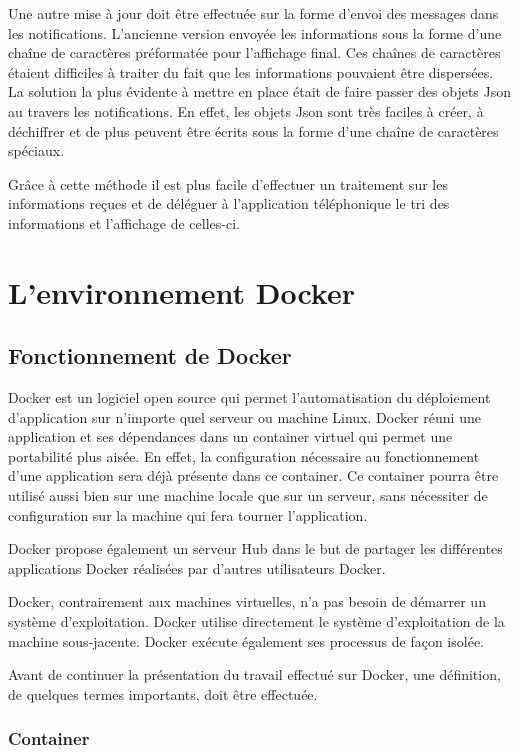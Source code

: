 Une autre mise à jour doit être effectuée sur la forme d'envoi des messages dans les notifications. L'ancienne version envoyée les informations sous la forme d'une chaîne de caractères préformatée pour l'affichage final. Ces chaînes de caractères étaient difficiles à traiter du fait que les informations pouvaient être dispersées. La solution la plus évidente à mettre en place était de faire passer des objets Json au travers les notifications. En effet, les objets Json sont très faciles à créer, à déchiffrer et de plus peuvent être écrits sous la forme d'une chaîne de caractères spéciaux.

Grâce à cette méthode il est plus facile d'effectuer un traitement sur les informations reçues et de déléguer à l'application téléphonique le tri des informations et l'affichage de celles-ci.

\section{L'environnement Docker}

\subsection{Fonctionnement de Docker}

Docker est un logiciel open source qui permet l'automatisation du déploiement d'application sur n'importe quel serveur ou machine Linux. Docker réuni une application et ses dépendances dans un container virtuel qui permet une portabilité plus aisée. En effet, la configuration nécessaire au fonctionnement d'une application sera déjà présente dans ce container. Ce container pourra être utilisé aussi bien sur une machine locale que sur un serveur, sans nécessiter de configuration sur la machine qui fera tourner l'application.

Docker propose également un serveur Hub dans le but de partager les différentes applications Docker réalisées par d'autres utilisateurs Docker.

Docker, contrairement aux machines virtuelles, n'a pas besoin de démarrer un système d'exploitation. Docker utilise directement le système d'exploitation de la machine sous-jacente. Docker exécute également ses processus de façon isolée.

Avant de continuer la présentation du travail effectué sur Docker, une définition, de quelques termes importants, doit être effectuée. 



\subsubsection{Container}

